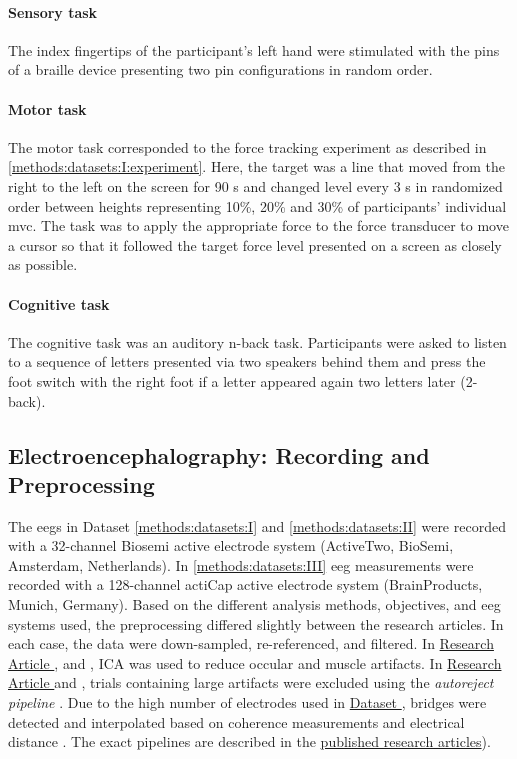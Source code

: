 \paragraph{Sensory task}
The index fingertips of the participant's left hand were stimulated with the pins of a braille device presenting two pin configurations in random order. 
\paragraph{Motor task} 
The motor task corresponded to the force tracking experiment as described in \autoref{methods:datasets:I:experiment}. Here, the target was a line that moved from the right to the left on the screen for 90 s and changed level every 3 s in randomized order between heights representing 10\%, 20\% and 30\% of participants' individual \gls{mvc}. The task was to apply the appropriate force to the force transducer to move a cursor so that it followed the target force level presented on a screen as closely as possible.
\paragraph{Cognitive task}
The cognitive task was an auditory n-back task. Participants were asked to listen to a sequence of letters presented via two speakers behind them and press the foot switch with the right foot if a letter appeared again two letters later (2-back).

\subsection{Electroencephalography: Recording and Preprocessing}
The \glspl{eeg} in Dataset \autoref{methods:datasets:I} and \autoref{methods:datasets:II} were recorded with a 32-channel Biosemi active electrode system (ActiveTwo, BioSemi, Amsterdam, Netherlands). In \autoref{methods:datasets:III} \gls{eeg} measurements were recorded with a 128-channel actiCap active electrode system (BrainProducts, Munich, Germany).
Based on the different analysis methods, objectives, and \gls{eeg} systems used, the preprocessing differed slightly between the research articles. In each case, the data were down-sampled, re-referenced, and filtered. In \hyperref[res:paperI]{Research Article }, \hyperref[res:paperIII]{} and \hyperref[res:paperIV]{}, ICA was used to reduce occular and muscle artifacts. In \hyperref[res:paperI]{Research Article } and \hyperref[res:paperIII]{}, trials containing large artifacts were excluded using the \textit{autoreject pipeline} \cite{Jas2017}. Due to the high number of electrodes used in \hyperref[methods:datasets:III]{Dataset }, bridges were detected and interpolated based on coherence measurements and electrical distance \cite{Alschuler2014}. The exact pipelines are described in the \hyperref[pub:papers]{published research articles}).  

